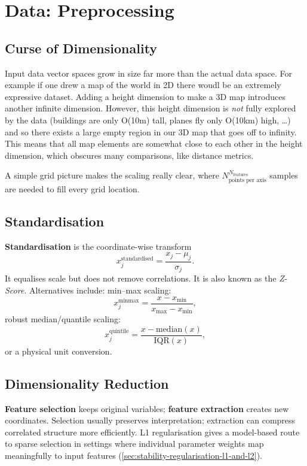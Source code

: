 \chapter{Data: Preprocessing}
\label{chap:representation}

\section{Curse of Dimensionality}
\label{sec:representation-the-curse-of-dimensionality}
Input data vector spaces grow in size far more than the actual data space.
For example if one drew a map of the world in 2D there woudl be an extremely expressive dataset.
Adding a height dimension to make a 3D map introduces another infinite dimension.
However, this height dimension is \textit{not} fully explored by the data (buildings are only O(10m) tall, planes fly only O(10km) high, \dots) and so there exists a large empty region in our 3D map that goes off to infinity.
This means that all map elements are somewhat close to each other in the height dimension, which obscures many comparisons, like distance metrics.

A simple grid picture makes the scaling really clear, where $N_{\text{points per axis}}^{N_{\text{features}}}$ samples are needed to fill every grid location.


\section{Standardisation}
\label{sec:representation-scaling-standardisation-and-leakage}
\textbf{Standardisation} is the coordinate-wise transform
\[
    x^{\text{standardised}}_j =
    \frac{
    x_j-\mu_j
    }{
    \sigma_{j}
    }.
\]
It equalises scale but does not remove correlations.
It is also known as the \textit{Z-Score}.
Alternatives include:
min--max scaling:
\[
    x^{\text{minmax}}_j = \frac{x - x_{\text{min}}}{x_{\text{max}} - x_{\text{min}}},
\]
robust median/quantile scaling:
\[
    x^{\text{quintile}}_j = \frac{x - \text{median}(x)}{\text{IQR}(x)},
\]
or a physical unit conversion.


\section{Dimensionality Reduction}
\label{sec:representation-dimensionality-reduction-selection-versus-transformation}
\textbf{Feature selection} keeps original variables; \textbf{feature extraction} creates new coordinates.
Selection usually preserves interpretation; extraction can compress correlated structure more efficiently.
L1 regularisation gives a model-based route to sparse selection in settings where individual parameter weights map meaningfully to input features (\cref{sec:stability-regularisation-l1-and-l2}).

